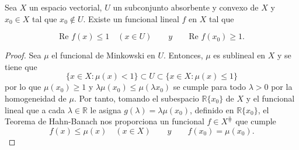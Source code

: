 \begin{corolario}
Sea $X$ un espacio vectorial, $U$ un subconjunto absorbente y convexo de $X$ y $x_{0}\in X$ tal que $x_{0}\notin U$. Existe un funcional lineal $f$ en $X$ tal que 

\begin{equation}
\text{Re } f(x)\leq 1 \quad (x\in U) \qquad y \qquad \text{Re }f(x_{0})\geq 1.
\end{equation}

\end{corolario}
\begin{proof}
Sea $\mu$ el funcional de Minkowski en $U$. Entonces, $\mu$ es sublineal en $X$ y se tiene que 
\begin{equation}
\{x\in X : \mu (x) < 1\} \subset U \subset \{x\in X : \mu (x) \leq 1\}
\end{equation}
por lo que $\mu (x_{0}) \geq 1$ y $\lambda \mu (x_{0}) \leq \mu(\lambda x_{0})$ se cumple para todo  $\lambda > 0$ por la homogeneidad de $\mu$. Por tanto, tomando el subespacio $\mathds{R}\{x_{0}\}$ de $X$ y el funcional lineal que a cada $\lambda\in\mathds{R}$ le asigna  $g(\lambda)=\lambda\mu(x_{0})$, definido en $\mathds{R}\{x_{0}\}$, el Teorema de Hahn-Banach nos proporciona un funcional $f\in X^{\hash}$ que cumple
\begin{equation}
f(x) \leq \mu (x) \quad (x\in X) \qquad y \qquad f(x_{0}) = \mu (x_{0}).
\end{equation}
\end{proof}

